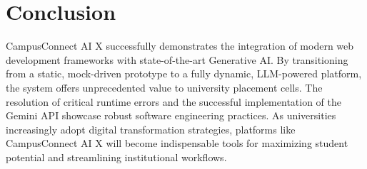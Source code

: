 \documentclass[12pt,a4paper]{report}
\begin{document}
\chapter{Conclusion}
CampusConnect AI X successfully demonstrates the integration of modern web development frameworks with state-of-the-art Generative AI. By transitioning from a static, mock-driven prototype to a fully dynamic, LLM-powered platform, the system offers unprecedented value to university placement cells. The resolution of critical runtime errors and the successful implementation of the Gemini API showcase robust software engineering practices. As universities increasingly adopt digital transformation strategies, platforms like CampusConnect AI X will become indispensable tools for maximizing student potential and streamlining institutional workflows.
\end{document}
